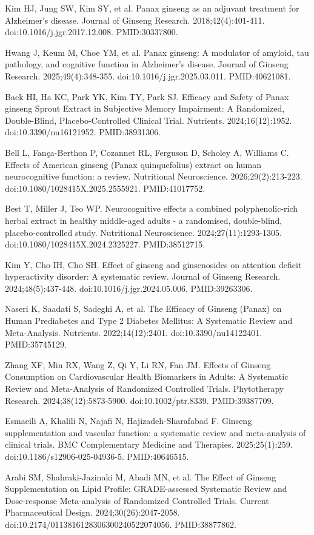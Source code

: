 \documentclass[11pt,oneside]{book}
\newcommand{\reff}[2]{\par\hangindent=7mm\hangafter=1\noindent[#1]\hspace{2mm}#2\par}
\begin{document}
\reff{46}{Kim HJ, Jung SW, Kim SY, et al. Panax ginseng as an adjuvant treatment for Alzheimer's disease. Journal of Ginseng Research. 2018;42(4):401-411. doi:10.1016/j.jgr.2017.12.008. PMID:30337800.}
\reff{47}{Hwang J, Keum M, Choe YM, et al. Panax ginseng: A modulator of amyloid, tau pathology, and cognitive function in Alzheimer's disease. Journal of Ginseng Research. 2025;49(4):348-355. doi:10.1016/j.jgr.2025.03.011. PMID:40621081.}
\reff{48}{Baek HI, Ha KC, Park YK, Kim TY, Park SJ. Efficacy and Safety of Panax ginseng Sprout Extract in Subjective Memory Impairment: A Randomized, Double-Blind, Placebo-Controlled Clinical Trial. Nutrients. 2024;16(12):1952. doi:10.3390/nu16121952. PMID:38931306.}
\reff{49}{Bell L, Fança-Berthon P, Cozannet RL, Ferguson D, Scholey A, Williams C. Effects of American ginseng (Panax quinquefolius) extract on human neurocognitive function: a review. Nutritional Neuroscience. 2026;29(2):213-223. doi:10.1080/1028415X.2025.2555921. PMID:41017752.}
\reff{50}{Best T, Miller J, Teo WP. Neurocognitive effects a combined polyphenolic-rich herbal extract in healthy middle-aged adults - a randomised, double-blind, placebo-controlled study. Nutritional Neuroscience. 2024;27(11):1293-1305. doi:10.1080/1028415X.2024.2325227. PMID:38512715.}
\reff{51}{Kim Y, Cho IH, Cho SH. Effect of ginseng and ginsenosides on attention deficit hyperactivity disorder: A systematic review. Journal of Ginseng Research. 2024;48(5):437-448. doi:10.1016/j.jgr.2024.05.006. PMID:39263306.}
\reff{52}{Naseri K, Saadati S, Sadeghi A, et al. The Efficacy of Ginseng (Panax) on Human Prediabetes and Type 2 Diabetes Mellitus: A Systematic Review and Meta-Analysis. Nutrients. 2022;14(12):2401. doi:10.3390/nu14122401. PMID:35745129.}
\reff{53}{Zhang XF, Min RX, Wang Z, Qi Y, Li RN, Fan JM. Effects of Ginseng Consumption on Cardiovascular Health Biomarkers in Adults: A Systematic Review and Meta-Analysis of Randomized Controlled Trials. Phytotherapy Research. 2024;38(12):5873-5900. doi:10.1002/ptr.8339. PMID:39387709.}
\reff{54}{Esmaeili A, Khalili N, Najafi N, Hajizadeh-Sharafabad F. Ginseng supplementation and vascular function: a systematic review and meta-analysis of clinical trials. BMC Complementary Medicine and Therapies. 2025;25(1):259. doi:10.1186/s12906-025-04936-5. PMID:40646515.}
\reff{55}{Arabi SM, Shahraki-Jazinaki M, Abadi MN, et al. The Effect of Ginseng Supplementation on Lipid Profile: GRADE-assessed Systematic Review and Dose-response Meta-analysis of Randomized Controlled Trials. Current Pharmaceutical Design. 2024;30(26):2047-2058. doi:10.2174/0113816128306300240522074056. PMID:38877862.}
\end{document}
